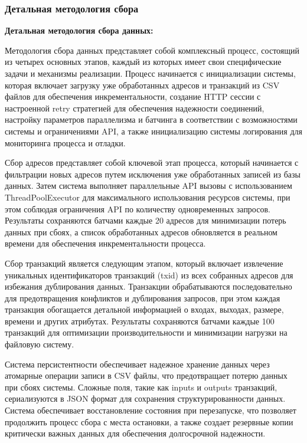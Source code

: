 \subsubsection{Детальная методология сбора}

\textbf{Детальная методология сбора данных:}

Методология сбора данных представляет собой комплексный процесс, состоящий из четырех основных этапов, каждый из которых имеет свои специфические задачи и механизмы реализации. Процесс начинается с инициализации системы, которая включает загрузку уже обработанных адресов и транзакций из CSV файлов для обеспечения инкрементальности, создание HTTP сессии с настроенной retry стратегией для обеспечения надежности соединений, настройку параметров параллелизма и батчинга в соответствии с возможностями системы и ограничениями API, а также инициализацию системы логирования для мониторинга процесса и отладки.

Сбор адресов представляет собой ключевой этап процесса, который начинается с фильтрации новых адресов путем исключения уже обработанных записей из базы данных. Затем система выполняет параллельные API вызовы с использованием ThreadPoolExecutor для максимального использования ресурсов системы, при этом соблюдая ограничения API по количеству одновременных запросов. Результаты сохраняются батчами каждые 20 адресов для минимизации потерь данных при сбоях, а список обработанных адресов обновляется в реальном времени для обеспечения инкрементальности процесса.

Сбор транзакций является следующим этапом, который включает извлечение уникальных идентификаторов транзакций (txid) из всех собранных адресов для избежания дублирования данных. Транзакции обрабатываются последовательно для предотвращения конфликтов и дублирования запросов, при этом каждая транзакция обогащается детальной информацией о входах, выходах, размере, времени и других атрибутах. Результаты сохраняются батчами каждые 100 транзакций для оптимизации производительности и минимизации нагрузки на файловую систему.

Система персистентности обеспечивает надежное хранение данных через атомарные операции записи в CSV файлы, что предотвращает потерю данных при сбоях системы. Сложные поля, такие как inputs и outputs транзакций, сериализуются в JSON формат для сохранения структурированности данных. Система обеспечивает восстановление состояния при перезапуске, что позволяет продолжить процесс сбора с места остановки, а также создает резервные копии критически важных данных для обеспечения долгосрочной надежности.

